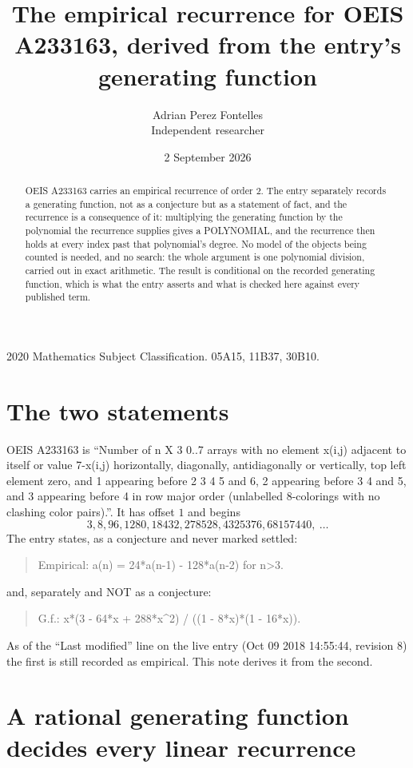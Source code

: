 \documentclass[11pt,a4paper]{article}
\title{The empirical recurrence for OEIS A233163, derived from the entry's generating function}
\author{Adrian Perez Fontelles\\ \small Independent researcher}
\date{2 September 2026}
\theoremstyle{plain}
\theoremstyle{definition}
\begin{document}
\maketitle

\begin{abstract}
OEIS A233163 carries an empirical recurrence of order $2$. The entry separately records a
generating function, not as a conjecture but as a statement of fact, and the recurrence is a
consequence of it: multiplying the generating function by the polynomial the recurrence
supplies gives a POLYNOMIAL, and the recurrence then holds at every index past that
polynomial's degree. No model of the objects being counted is needed, and no search: the
whole argument is one polynomial division, carried out in exact arithmetic. The result is
conditional on the recorded generating function, which is what the entry asserts and what is
checked here against every published term.
\end{abstract}

\noindent\small 2020 Mathematics Subject Classification. 05A15, 11B37, 30B10.\normalsize

\section{The two statements}

OEIS A233163 is ``Number of n X 3 0..7 arrays with no element x(i,j) adjacent to itself or value 7-x(i,j) horizontally, diagonally, antidiagonally or vertically, top left element zero, and 1 appearing before 2 3 4 5 and 6, 2 appearing before 3 4 and 5, and 3 appearing before 4 in row major order (unlabelled 8-colorings with no clashing color pairs).''. It has offset $1$ and begins
\[
3, 8, 96, 1280, 18432, 278528, 4325376, 68157440,\ \dots
\]
The entry states, as a conjecture and never marked settled:
\begin{quote}
Empirical: a(n) = 24*a(n-1) - 128*a(n-2) for n>3.
\end{quote}
and, separately and NOT as a conjecture:
\begin{quote}
G.f.: x*(3 - 64*x + 288*x\^{}2) / ((1 - 8*x)*(1 - 16*x)).
\end{quote}
As of the ``Last modified'' line on the live entry (Oct 09 2018 14:55:44, revision 8) the first is still
recorded as empirical. This note derives it from the second.

\section{A rational generating function decides every linear recurrence}
\end{document}

